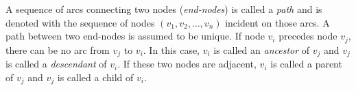 A sequence of arcs connecting two nodes (\textit{end-nodes}) is called a \textit{path} and is denoted with the sequence of nodes $\left(v_{1}, v_{2}, \ldots, v_{n}\right)$ incident on those arcs. A path between two end-nodes is assumed to be unique. If node $v_i$ precedes node $v_j$, there can be no arc from $v_j$ to $v_i$. In this case, $v_i$ is called an \textit{ancestor} of $v_j$ and $v_j$ is called a \textit{descendant} of $v_i$. If these two nodes are adjacent, $v_i$ is called a parent of $v_j$ and $v_j$ is called a child of $v_i$.






